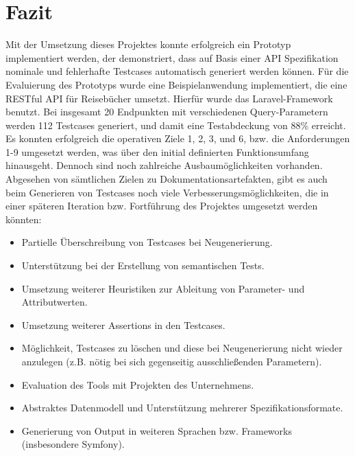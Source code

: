 
\section{Fazit}

Mit der Umsetzung dieses Projektes konnte erfolgreich ein Prototyp implementiert werden, der demonstriert, dass auf Basis einer API Spezifikation nominale und fehlerhafte Testcases automatisch generiert werden können. Für die Evaluierung des Prototyps wurde eine Beispielanwendung implementiert, die eine RESTful API für Reisebücher umsetzt. Hierfür wurde das Laravel-Framework benutzt. Bei insgesamt 20 Endpunkten mit verschiedenen Query-Parametern werden 112 Testcases generiert, und damit eine Testabdeckung von 88\% erreicht. \\

Es konnten erfolgreich die operativen Ziele 1, 2, 3, und 6, bzw. die Anforderungen 1-9 umgesetzt werden, was über den initial definierten Funktionsumfang hinausgeht. Dennoch sind noch zahlreiche Ausbaumöglichkeiten vorhanden. Abgesehen von sämtlichen Zielen zu Dokumentationsartefakten, gibt es auch beim Generieren von Testcases noch viele Verbesserungsmöglichkeiten, die in einer späteren Iteration bzw. Fortführung des Projektes umgesetzt werden könnten:

\begin{itemize}
	\item Partielle Überschreibung von Testcases bei Neugenerierung.
	\item Unterstützung bei der Erstellung von semantischen Tests.
	\item Umsetzung weiterer Heuristiken zur Ableitung von Parameter- und Attributwerten.
	\item Umsetzung weiterer Assertions in den Testcases.
	\item Möglichkeit, Testcases zu löschen und diese bei Neugenerierung nicht wieder anzulegen (z.B. nötig bei sich gegenseitig ausschließenden Parametern).
	\item Evaluation des Tools mit Projekten des Unternehmens.
	\item Abstraktes Datenmodell und Unterstützung mehrerer Spezifikationsformate.
	\item Generierung von Output in weiteren Sprachen bzw. Frameworks (insbesondere Symfony).
\end{itemize}

